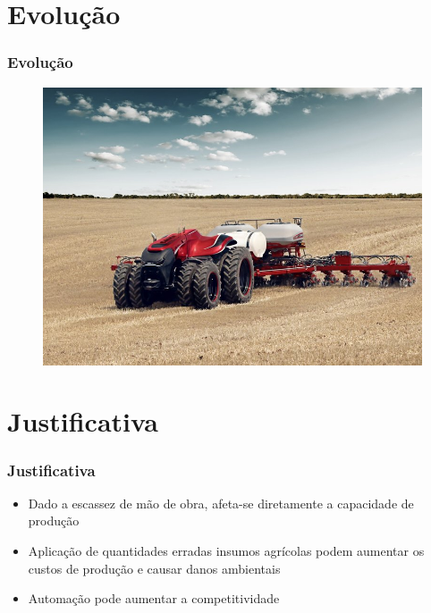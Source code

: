 \documentclass{beamer}
\begin{document}
\section[]{Evolução}

\begin{frame}
\frametitle{Evolução}

\begin{figure}[!htb]
\centering
\includegraphics[scale=0.25]{imgs/autonomous.jpeg}
\label{Rotulo}
\end{figure}


\end{frame}
\section[Justificativa]{Justificativa}

\begin{frame}
\frametitle{Justificativa}
\begin{itemize}
    \item Dado a escassez de mão de obra, afeta-se diretamente a capacidade de produção
    \item Aplicação de quantidades erradas insumos agrícolas podem aumentar os custos de produção e causar danos ambientais
    \item Automação pode aumentar a competitividade
\end{itemize}

\justifying
\Large
\end{frame}
\end{document}
